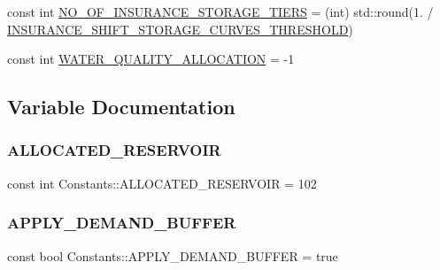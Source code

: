 \begin{DoxyCompactItemize}
\item 
const int \mbox{\hyperlink{namespaceConstants_ae6ed2a07e84e5c0280325e2dffd3ceca_ae6ed2a07e84e5c0280325e2dffd3ceca}{N\+O\+\_\+\+O\+F\+\_\+\+I\+N\+S\+U\+R\+A\+N\+C\+E\+\_\+\+S\+T\+O\+R\+A\+G\+E\+\_\+\+T\+I\+E\+RS}} = (int) std\+::round(1. / \mbox{\hyperlink{namespaceConstants_a40ab8dd088d886af9b5795c6b9db22ca_a40ab8dd088d886af9b5795c6b9db22ca}{I\+N\+S\+U\+R\+A\+N\+C\+E\+\_\+\+S\+H\+I\+F\+T\+\_\+\+S\+T\+O\+R\+A\+G\+E\+\_\+\+C\+U\+R\+V\+E\+S\+\_\+\+T\+H\+R\+E\+S\+H\+O\+LD}})
\item 
const int \mbox{\hyperlink{namespaceConstants_a35b1f837d5193288c3de6cb4d72f113c_a35b1f837d5193288c3de6cb4d72f113c}{W\+A\+T\+E\+R\+\_\+\+Q\+U\+A\+L\+I\+T\+Y\+\_\+\+A\+L\+L\+O\+C\+A\+T\+I\+ON}} = -\/1
\end{DoxyCompactItemize}


\subsection{Variable Documentation}
\mbox{\label{namespaceConstants_a2769e2f1bc080457c78297402e78c8d1_a2769e2f1bc080457c78297402e78c8d1}} 
\subsubsection{\texorpdfstring{A\+L\+L\+O\+C\+A\+T\+E\+D\+\_\+\+R\+E\+S\+E\+R\+V\+O\+IR}{ALLOCATED\_RESERVOIR}}
{\footnotesize\ttfamily const int Constants\+::\+A\+L\+L\+O\+C\+A\+T\+E\+D\+\_\+\+R\+E\+S\+E\+R\+V\+O\+IR = 102}

\mbox{\label{namespaceConstants_a6d0d721f1c6d8807ddeb8b80eb165108_a6d0d721f1c6d8807ddeb8b80eb165108}} 
\subsubsection{\texorpdfstring{A\+P\+P\+L\+Y\+\_\+\+D\+E\+M\+A\+N\+D\+\_\+\+B\+U\+F\+F\+ER}{APPLY\_DEMAND\_BUFFER}}
{\footnotesize\ttfamily const bool Constants\+::\+A\+P\+P\+L\+Y\+\_\+\+D\+E\+M\+A\+N\+D\+\_\+\+B\+U\+F\+F\+ER = true}

